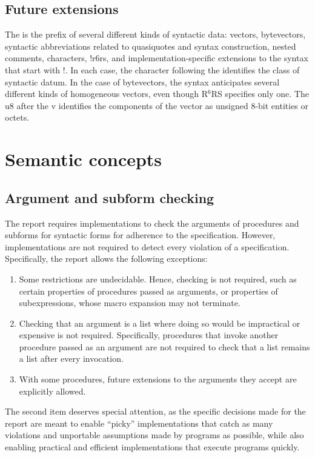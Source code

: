 \documentclass[twoside,twocolumn]{algol60}
\newcommand{\rn}[1]{R$^{#1}$RS}
\begin{document}
\section{Future extensions}

The {\cf\sharpsign} is the prefix of several different kinds of
syntactic data: vectors, bytevectors, syntactic abbreviations related
to quasiquotes and syntax construction, nested comments, characters,
{\cf\sharpsign!r6rs}, and implementation-specific extensions to the
syntax that start with {\cf\sharpsign!}.  In each case, the character
following the {\cf\sharpsign} identifies the class of syntactic datum.
In the case of bytevectors, the syntax anticipates several different
kinds of homogeneous vectors, even though \rn{6} specifies only
one. The {\cf u8} after the {\cf\sharpsign{}v} identifies the
components of the vector as unsigned 8-bit entities or octets.


\chapter{Semantic concepts}

\section{Argument and subform checking}
\label{argumentchecking}

The report requires implementations to check the arguments of
procedures and subforms for syntactic forms for adherence to the
specification.  However, implementations are not required to detect
every violation of a specification.  Specifically, the report allows
the following exceptions:
%
\begin{enumerate}
\item Some restrictions are undecidable.  Hence, checking is not
  required, such as certain properties of procedures passed as
  arguments, or properties of subexpressions, whose macro expansion
  may not terminate.
\item Checking that an argument is a list where doing so would be
  impractical or expensive is not required.  Specifically, procedures that
  invoke another procedure passed as an argument are not required to
  check that a list remains a list after every invocation.
\item With some procedures, future extensions to the arguments they
  accept are explicitly allowed.
\end{enumerate}
%
The second item deserves special attention, as the specific decisions
made for the report are meant to enable ``picky'' implementations that
catch as many violations and unportable assumptions made by programs
as possible, while also enabling practical and efficient
implementations that execute programs quickly.
\end{document}
